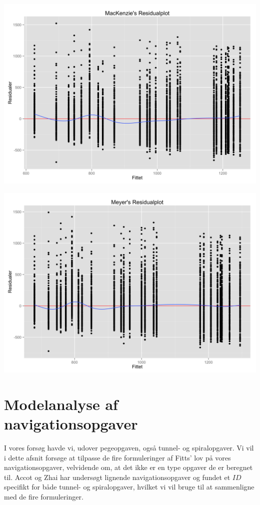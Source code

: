 \begin{minipage}{\linewidth}
\begin{minipage}{.5\linewidth}
		\includegraphics[width=\linewidth]{images/plots/plot_residual_mackenzie}
		\label{fig:plot_residual_mackenzie}
	\end{minipage}
	\begin{minipage}{.5\linewidth}
		\includegraphics[width=\linewidth]{images/plots/plot_residual_meyer}
		\label{fig:plot_residual_meyer}
	\end{minipage}
\end{minipage}

\section*{Modelanalyse af navigationsopgaver}
I vores forsøg havde vi, udover pegeopgaven, også tunnel- og spiralopgaver. Vi vil i dette afsnit forsøge at tilpasse de fire formuleringer af Fitts' lov på vores navigationsopgaver, velvidende om, at det ikke er en type opgaver de er beregnet til. Accot og Zhai har undersøgt lignende navigationsopgaver og fundet et $ID$ specifikt for både tunnel- og spiralopgaver, hvilket vi vil bruge til at sammenligne med de fire formuleringer\cite{accot1997}.

